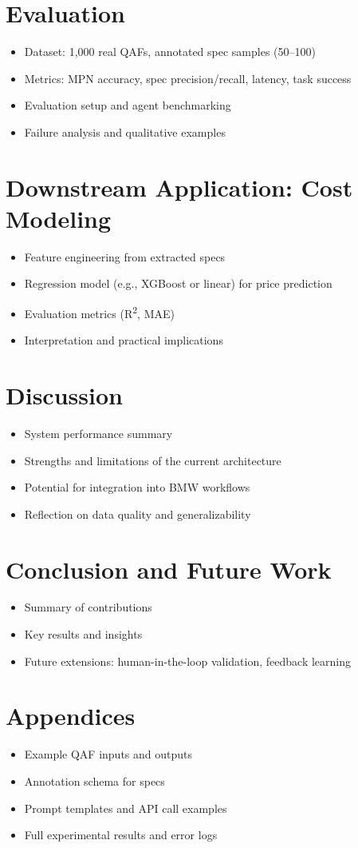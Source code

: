 \documentclass[11pt]{article}
\begin{document}
\section{Evaluation}
\begin{itemize}
  \item Dataset: 1,000 real QAFs, annotated spec samples (50--100)
  \item Metrics: MPN accuracy, spec precision/recall, latency, task success
  \item Evaluation setup and agent benchmarking
  \item Failure analysis and qualitative examples
\end{itemize}

\section{Downstream Application: Cost Modeling}
\begin{itemize}
  \item Feature engineering from extracted specs
  \item Regression model (e.g., XGBoost or linear) for price prediction
  \item Evaluation metrics (R\textsuperscript{2}, MAE)
  \item Interpretation and practical implications
\end{itemize}

\section{Discussion}
\begin{itemize}
  \item System performance summary
  \item Strengths and limitations of the current architecture
  \item Potential for integration into BMW workflows
  \item Reflection on data quality and generalizability
\end{itemize}

\section{Conclusion and Future Work}
\begin{itemize}
  \item Summary of contributions
  \item Key results and insights
  \item Future extensions: human-in-the-loop validation, feedback learning
\end{itemize}

\appendix
\section*{Appendices}
\begin{itemize}
  \item Example QAF inputs and outputs
  \item Annotation schema for specs
  \item Prompt templates and API call examples
  \item Full experimental results and error logs
\end{itemize}
\end{document}
